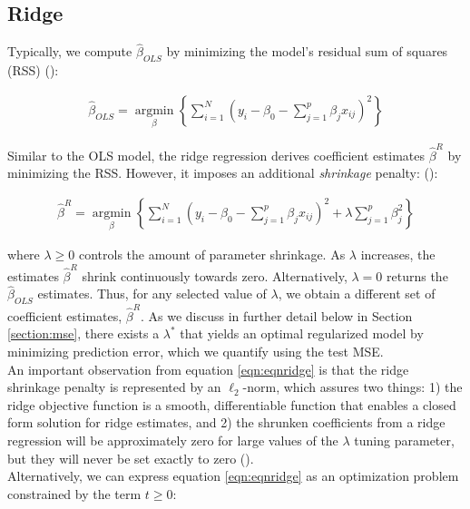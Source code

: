 \subsection{Ridge}
\noindent Typically, we compute $\hat{\beta}_{OLS}$ by minimizing the model's residual sum of squares (RSS) (\cite{hastie2008elements}):

\begin{align}
\label{eqn:eqnolsmin}
\hat{\beta}_{OLS} = \underset{\beta}{\operatorname{argmin}}\left\{\sum_{i=1}^{N}\left(y_{i}-\beta_{0}-\sum_{j=1}^{p} \beta_{j} x_{i j} \right)^{2}\right\}
\end{align}

\noindent Similar to the OLS model, the ridge regression derives coefficient estimates $\hat{\beta}^{R}$ by minimizing the RSS. However, it imposes an additional \emph{shrinkage} penalty: (\cite{hastie2008elements}): 

\begin{align}
\label{eqn:eqnridge}
\hat{\beta}^{R} = \underset{\beta}{\operatorname{argmin}}\left\{\sum_{i=1}^{N}\left(y_{i}-\beta_{0}-\sum_{j=1}^{p} \beta_{j} x_{i j} \right)^{2}+\lambda \sum_{j=1}^{p}\beta_{j}^{2}\right\}
\end{align}

\noindent where $\lambda \ge 0$ controls the amount of parameter shrinkage. As $\lambda$ increases, the estimates $\hat{\beta}^{R}$ shrink continuously towards zero. Alternatively, $\lambda=0$ returns the $\hat{\beta}_{OLS}$ estimates. Thus, for any selected value of $\lambda$, we obtain a different set of coefficient estimates, $\hat{\beta}^{R}$. As we discuss in further detail below in Section \ref{section:mse}, there exists a $\lambda^*$ that yields an optimal regularized model by minimizing prediction error, which we quantify using the test MSE.  \\

\noindent An important observation from equation \eqref{eqn:eqnridge} is that the ridge shrinkage penalty is represented by an $\ell_2$-norm, which assures two things: 1) the ridge objective function is a smooth, differentiable function that enables a closed form solution for ridge estimates, and 2) the shrunken coefficients from a ridge regression will be approximately zero for large values of the $\lambda$ tuning parameter, but they will never be set exactly to zero (\cite{murphy2012machine}). \\

\noindent Alternatively, we can express equation \eqref{eqn:eqnridge} as an optimization problem constrained by the term $t \ge 0$: 

